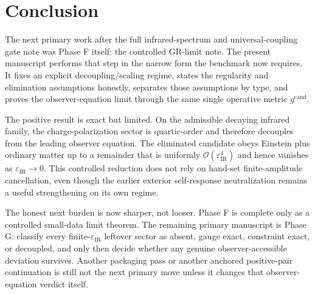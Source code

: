 \documentclass[11pt]{article}
\newcommand{\CandidateMetric}{g^{\mathrm{cand}}}
\newcommand{\IRsmall}{\varepsilon_{\mathrm{IR}}}
\begin{document}
\section{Conclusion}

The next primary work after the full infrared-spectrum and universal-coupling gate note was Phase F itself: the controlled GR-limit note. The present manuscript performs that step in the narrow form the benchmark now requires. It fixes an explicit decoupling/scaling regime, states the regularity and elimination assumptions honestly, separates those assumptions by type, and proves the observer-equation limit through the same single operative metric \(\CandidateMetric\).

The positive result is exact but limited. On the admissible decaying infrared family, the charge-polarization sector is quartic-order and therefore decouples from the leading observer equation. The eliminated candidate obeys Einstein plus ordinary matter up to a remainder that is uniformly \(\mathcal O(\IRsmall^4)\) and hence vanishes as \(\IRsmall\to0\). This controlled reduction does not rely on hand-set finite-amplitude cancellation, even though the earlier exterior self-response neutralization remains a useful strengthening on its own regime.

The honest next burden is now sharper, not looser. Phase F is complete only as a controlled small-data limit theorem. The remaining primary manuscript is Phase G: classify every finite-\(\IRsmall\) leftover sector as absent, gauge exact, constraint exact, or decoupled, and only then decide whether any genuine observer-accessible deviation survives. Another packaging pass or another anchored positive-pair continuation is still not the next primary move unless it changes that observer-equation verdict itself.
\end{document}
